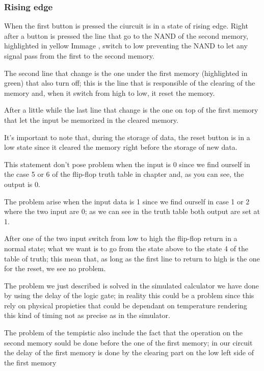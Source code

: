 \documentclass{article}
\begin{document}


\subsubsection{Rising edge}

When the first button is pressed the ciurcuit is in a state of rising edge. 
Right after a button is pressed the line that go to the NAND of the second memory, highlighted in yellow Immage %
, switch to low preventing the NAND to let any signal pass from the first to the second memory.

The second line that change is the one under the first memory (highlighted in green) that also turn off; this is the line that is responsible of the clearing of the memory and, when it switch from high to low, it reset the memory.

After a little while the last line that change is the one on top of the first memory that let the input be memorized in the cleared memory.

\vspace{3mm}

It's important to note that, during the storage of data, the reset button is in a low state since it cleared the memory right before the storage of new data.

This statement don't pose problem when the input is 0 since we find ourself in the case 5 or 6 of the flip-flop truth table in chapter %
and, as you can see, the output is 0. 

The problem arise when the input data is 1 since we find ourself in case 1 or 2 where the two input are 0; as we can see in the truth table both output are set at 1.

After one of the two input switch from low to high the flip-flop return in a normal state; what we want is to go from the state above to the state 4 of the table of truth; this mean that, as long as the first line to return to high is the one for the reset, we see no problem.

\vspace{3mm}

The problem we just described is solved in the simulated calculator we have done by using the delay of the logic gate; in reality this could be a problem since this rely on physical propieties that could be dependant on temperature rendering this kind of timing not as precise as in the simulator.

The problem of the tempistic also include the fact that the operation on the second memory sould be done before the one of the first memory; in our circuit the delay of the first memory is done by the clearing part on the low left side of the first memory
\end{document}
